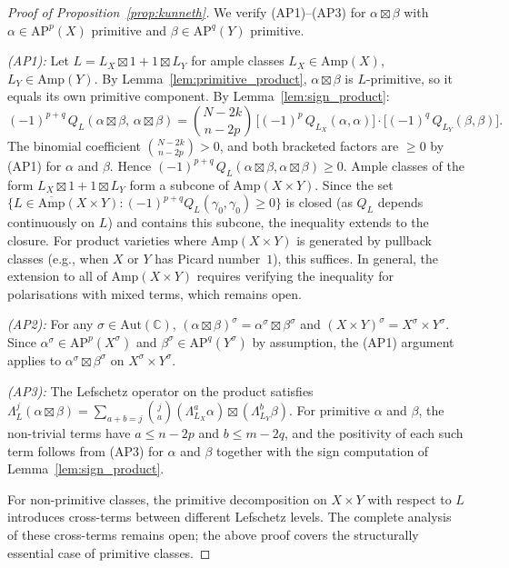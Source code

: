 \documentclass[aps,prd,twocolumn,superscriptaddress,nofootinbib]{revtex4-2}
\theoremstyle{definition}
\theoremstyle{remark}
\begin{document}
\begin{proof}[Proof of Proposition~\ref{prop:kunneth}]
We verify (AP1)--(AP3) for $\alpha \boxtimes \beta$ with $\alpha \in \mathrm{AP}^p(X)$ primitive and $\beta \in \mathrm{AP}^q(Y)$ primitive.

\textit{(AP1):} Let $L = L_X \boxtimes 1 + 1 \boxtimes L_Y$ for ample classes $L_X \in \mathrm{Amp}(X)$, $L_Y \in \mathrm{Amp}(Y)$. By Lemma~\ref{lem:primitive_product}, $\alpha \boxtimes \beta$ is $L$-primitive, so it equals its own primitive component. By Lemma~\ref{lem:sign_product}:
\[
(-1)^{p+q}\, Q_L(\alpha \boxtimes \beta,\, \alpha \boxtimes \beta) = \binom{N-2k}{n-2p}\, \bigl[(-1)^p\, Q_{L_X}(\alpha, \alpha)\bigr] \cdot \bigl[(-1)^q\, Q_{L_Y}(\beta, \beta)\bigr].
\]
The binomial coefficient $\binom{N-2k}{n-2p} > 0$, and both bracketed factors are $\geq 0$ by (AP1) for $\alpha$ and $\beta$. Hence $(-1)^{p+q}\, Q_L(\alpha \boxtimes \beta, \alpha \boxtimes \beta) \geq 0$. Ample classes of the form $L_X \boxtimes 1 + 1 \boxtimes L_Y$ form a subcone of $\mathrm{Amp}(X \times Y)$. Since the set $\{L \in \overline{\mathrm{Amp}}(X \times Y) : (-1)^{p+q} Q_L(\gamma_0, \gamma_0) \geq 0\}$ is closed (as $Q_L$ depends continuously on $L$) and contains this subcone, the inequality extends to the closure. For product varieties where $\mathrm{Amp}(X \times Y)$ is generated by pullback classes (e.g., when $X$ or $Y$ has Picard number~$1$), this suffices. In general, the extension to all of $\mathrm{Amp}(X \times Y)$ requires verifying the inequality for polarisations with mixed terms, which remains open.

\textit{(AP2):} For any $\sigma \in \mathrm{Aut}(\mathbb{C})$, $(\alpha \boxtimes \beta)^\sigma = \alpha^\sigma \boxtimes \beta^\sigma$ and $(X \times Y)^\sigma = X^\sigma \times Y^\sigma$. Since $\alpha^\sigma \in \mathrm{AP}^p(X^\sigma)$ and $\beta^\sigma \in \mathrm{AP}^q(Y^\sigma)$ by assumption, the (AP1) argument applies to $\alpha^\sigma \boxtimes \beta^\sigma$ on $X^\sigma \times Y^\sigma$.

\textit{(AP3):} The Lefschetz operator on the product satisfies $\Lambda_L^j(\alpha \boxtimes \beta) = \sum_{a+b=j} \binom{j}{a} (\Lambda_{L_X}^a \alpha) \boxtimes (\Lambda_{L_Y}^b \beta)$. For primitive $\alpha$ and $\beta$, the non-trivial terms have $a \leq n-2p$ and $b \leq m-2q$, and the positivity of each such term follows from (AP3) for $\alpha$ and $\beta$ together with the sign computation of Lemma~\ref{lem:sign_product}.

For non-primitive classes, the primitive decomposition on $X \times Y$ with respect to $L$ introduces cross-terms between different Lefschetz levels. The complete analysis of these cross-terms remains open; the above proof covers the structurally essential case of primitive classes.
\end{proof}
\end{document}
